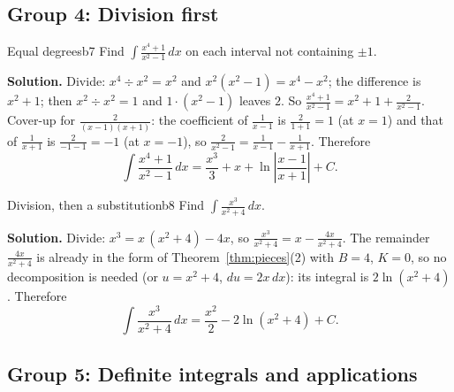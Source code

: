 \documentclass[11pt]{article}
\begin{document}
\subsection*{Group 4: Division first}

\begin{exmp}{Equal degrees}{b7}
Find $\displaystyle\int\frac{x^4+1}{x^2-1}\,dx$ on each interval not containing $\pm1$.

\textbf{Solution.} Divide: $x^4\div x^2=x^2$ and $x^2(x^2-1)=x^4-x^2$; the difference is $x^2+1$; then $x^2\div x^2=1$ and $1\cdot(x^2-1)$ leaves $2$. So $\frac{x^4+1}{x^2-1}=x^2+1+\frac2{x^2-1}$. Cover-up for $\frac2{(x-1)(x+1)}$: the coefficient of $\frac1{x-1}$ is $\frac2{1+1}=1$ (at $x=1$) and that of $\frac1{x+1}$ is $\frac2{-1-1}=-1$ (at $x=-1$), so $\frac2{x^2-1}=\frac1{x-1}-\frac1{x+1}$. Therefore
\[\int\frac{x^4+1}{x^2-1}\,dx=\frac{x^3}3+x+\ln\left\lvert\frac{x-1}{x+1}\right\rvert+C .\]
\end{exmp}

\begin{exmp}{Division, then a substitution}{b8}
Find $\displaystyle\int\frac{x^3}{x^2+4}\,dx$.

\textbf{Solution.} Divide: $x^3=x\,(x^2+4)-4x$, so $\frac{x^3}{x^2+4}=x-\frac{4x}{x^2+4}$. The remainder $\frac{4x}{x^2+4}$ is already in the form of Theorem~\ref{thm:pieces}(2) with $B=4$, $K=0$, so no decomposition is needed (or $u=x^2+4$, $du=2x\,dx$): its integral is $2\ln(x^2+4)$. Therefore
\[\int\frac{x^3}{x^2+4}\,dx=\frac{x^2}2-2\ln\left(x^2+4\right)+C .\]
\end{exmp}

\subsection*{Group 5: Definite integrals and applications}
\end{document}
